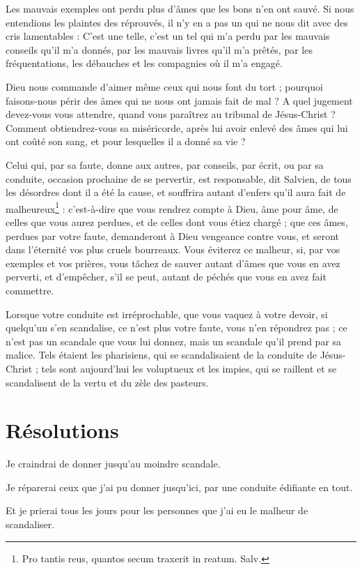 \documentclass[instructions.tex]{subfiles}
\begin{document}
Les mauvais exemples ont perdu plus d’âmes que les bons n’en ont sauvé. Si nous entendions les plaintes des réprouvés, il n’y en a pas un qui ne nous dit avec des cris lamentables : C’est une telle, c’est un tel qui m’a perdu par les mauvais conseils qu’il m’a donnés, par les mauvais livres qu’il m’a prêtés, par les fréquentations, les débauches et les compagnies où il m’a engagé.
 
Dieu nous commande d’aimer même ceux qui nous font du tort ; pourquoi faisons-nous périr des âmes qui ne nous ont jamais fait de mal ? A quel jugement devez-vous vous attendre, quand vous paraîtrez au tribunal de Jésus-Christ ? Comment obtiendrez-vous sa miséricorde, après lui avoir enlevé des âmes qui lui ont coûté son sang, et pour lesquelles il a donné sa vie ?
 
Celui qui, par sa faute, donne aux autres, par conseils, par écrit, ou par sa conduite, occasion prochaine de se pervertir, est responsable, dit Salvien, de tous les désordres dont il a été la cause, et souffrira autant d’enfers qu’il aura fait de malheureux\footnote{Pro tantis reus, quantos secum traxerit in reatum. Salv.} : c’est-à-dire que vous rendrez compte à Dieu, âme pour âme, de celles que vous aurez perdues, et de celles dont vous étiez chargé ; que ces âmes, perdues par votre faute, demanderont à Dieu vengeance contre vous, et seront dans l’éternité vos plus cruels bourreaux. Vous éviterez ce malheur, si, par vos exemples et vos prières, vous tâchez de sauver autant d’âmes que vous en avez perverti, et d’empêcher, s’il se peut, autant de péchés que vous en avez fait commettre.
 
Lorsque votre conduite est irréprochable, que vous vaquez à votre devoir, si quelqu’un s’en scandalise, ce n’est plus votre faute, vous n’en répondrez pas ; ce n’est pas un scandale que vous lui donnez, mais un scandale qu’il prend par sa malice. Tels étaient les pharisiens, qui se scandalisaient de la conduite de Jésus-Christ ; tels sont aujourd’hui les voluptueux et les impies, qui se raillent et se scandalisent de la vertu et du zèle des pasteurs.
 
\section{Résolutions}
 
\primo Je craindrai de donner jusqu’au moindre scandale. 

\secundo Je réparerai ceux que j’ai pu donner jusqu’ici, par une conduite édifiante en tout. 

\tertio Et je prierai tous les jours pour les personnes que j’ai eu le malheur de scandaliser. 

 
\end{document}

